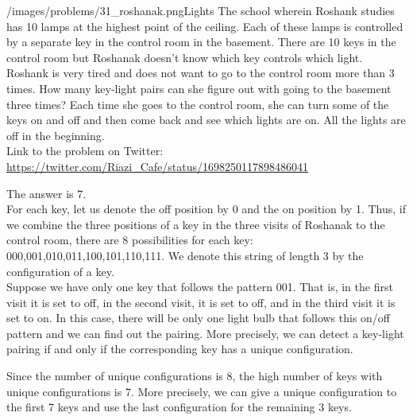 \begin{problem}{/images/problems/31_roshanak.png}{Lights} The school wherein Roshank studies has 10 lamps at the highest point of the ceiling. Each of these lamps is controlled by a separate key in the control room in the basement. There are 10 keys in the control room but Roshanak doesn't know which key controls which light.\\[0.2cm]

Roshank is very tired and does not want to go to the control room more than 3 times. How many key-light pairs can she figure out with going to the basement three times? Each time she goes to the control room, she can turn some of the keys on and off and then come back and see which lights are on. All the lights are off in the beginning.\\[0.2cm]

Link to the problem on Twitter:  \url{https://twitter.com/Riazi_Cafe/status/1698250117898486041}\end{problem}
\begin{solution}
The answer is  7.\\[0.2cm]

For each key, let us denote the off position by 0 and the on position by 1. Thus, if we combine the three positions of a key in the three visits of Roshanak to the control room, there are 8 possibilities for each key: 000,001,010,011,100,101,110,111. We denote this string of length 3 by the configuration of a key.\\[0.2cm]

Suppose we have only one key that follows the pattern 001. That is, in the first visit it is set to off, in the second visit, it is set to off, and in the third visit it is set to on. In this case, there will be only one light bulb that follows this on/off pattern and we can find out the pairing. More precisely, we can detect a key-light pairing if and only if the corresponding key has a unique configuration.

Since the number of unique configurations is 8, the high number of keys with unique configurations is 7. More precisely, we can give a unique configuration to the first 7 keys and use the last configuration for the remaining 3 keys. 
\end{solution}
